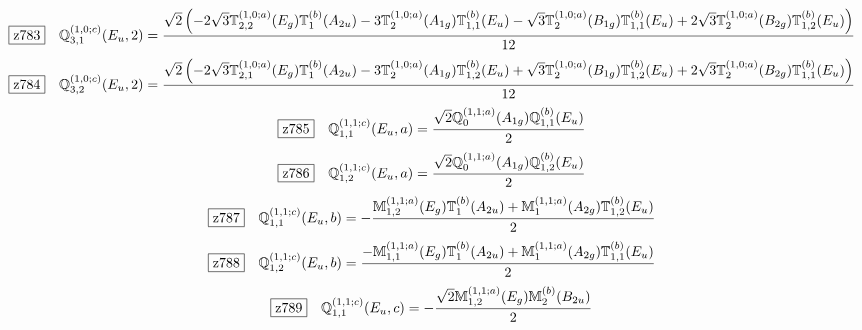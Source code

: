 \documentclass[fleqn,10pt,landscape]{jsarticle}
\begin{document}
\begin{dmath*}
\hspace*{3mm}\fbox{z783}\quad \mathbb{Q}_{3,1}^{(1,0;c)}(E_{u},2)=\frac{\sqrt{2} \left(- 2 \sqrt{3} \mathbb{T}_{2,2}^{(1,0;a)}(E_{g}) \mathbb{T}_{1}^{(b)}(A_{2u}) - 3 \mathbb{T}_{2}^{(1,0;a)}(A_{1g}) \mathbb{T}_{1,1}^{(b)}(E_{u}) - \sqrt{3} \mathbb{T}_{2}^{(1,0;a)}(B_{1g}) \mathbb{T}_{1,1}^{(b)}(E_{u}) + 2 \sqrt{3} \mathbb{T}_{2}^{(1,0;a)}(B_{2g}) \mathbb{T}_{1,2}^{(b)}(E_{u})\right)}{12}
\end{dmath*}
\begin{dmath*}
\hspace*{3mm}\fbox{z784}\quad \mathbb{Q}_{3,2}^{(1,0;c)}(E_{u},2)=\frac{\sqrt{2} \left(- 2 \sqrt{3} \mathbb{T}_{2,1}^{(1,0;a)}(E_{g}) \mathbb{T}_{1}^{(b)}(A_{2u}) - 3 \mathbb{T}_{2}^{(1,0;a)}(A_{1g}) \mathbb{T}_{1,2}^{(b)}(E_{u}) + \sqrt{3} \mathbb{T}_{2}^{(1,0;a)}(B_{1g}) \mathbb{T}_{1,2}^{(b)}(E_{u}) + 2 \sqrt{3} \mathbb{T}_{2}^{(1,0;a)}(B_{2g}) \mathbb{T}_{1,1}^{(b)}(E_{u})\right)}{12}
\end{dmath*}
\begin{dmath*}
\hspace*{3mm}\fbox{z785}\quad \mathbb{Q}_{1,1}^{(1,1;c)}(E_{u},a)=\frac{\sqrt{2} \mathbb{Q}_{0}^{(1,1;a)}(A_{1g}) \mathbb{Q}_{1,1}^{(b)}(E_{u})}{2}
\end{dmath*}
\begin{dmath*}
\hspace*{3mm}\fbox{z786}\quad \mathbb{Q}_{1,2}^{(1,1;c)}(E_{u},a)=\frac{\sqrt{2} \mathbb{Q}_{0}^{(1,1;a)}(A_{1g}) \mathbb{Q}_{1,2}^{(b)}(E_{u})}{2}
\end{dmath*}
\begin{dmath*}
\hspace*{3mm}\fbox{z787}\quad \mathbb{Q}_{1,1}^{(1,1;c)}(E_{u},b)=- \frac{\mathbb{M}_{1,2}^{(1,1;a)}(E_{g}) \mathbb{T}_{1}^{(b)}(A_{2u}) + \mathbb{M}_{1}^{(1,1;a)}(A_{2g}) \mathbb{T}_{1,2}^{(b)}(E_{u})}{2}
\end{dmath*}
\begin{dmath*}
\hspace*{3mm}\fbox{z788}\quad \mathbb{Q}_{1,2}^{(1,1;c)}(E_{u},b)=\frac{- \mathbb{M}_{1,1}^{(1,1;a)}(E_{g}) \mathbb{T}_{1}^{(b)}(A_{2u}) + \mathbb{M}_{1}^{(1,1;a)}(A_{2g}) \mathbb{T}_{1,1}^{(b)}(E_{u})}{2}
\end{dmath*}
\begin{dmath*}
\hspace*{3mm}\fbox{z789}\quad \mathbb{Q}_{1,1}^{(1,1;c)}(E_{u},c)=- \frac{\sqrt{2} \mathbb{M}_{1,2}^{(1,1;a)}(E_{g}) \mathbb{M}_{2}^{(b)}(B_{2u})}{2}
\end{dmath*}
\end{document}
